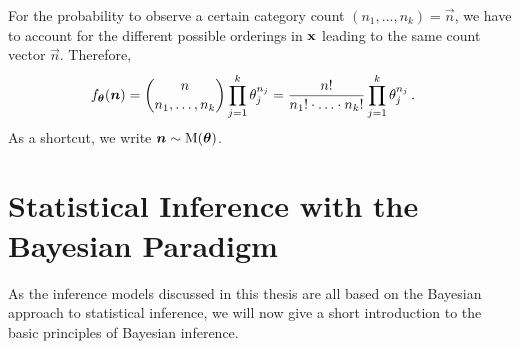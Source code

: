 For the probability to observe a certain category count $(n_1, \ldots, n_k) = \vec{n}$,
we have to account for the different possible orderings in $\mathbf{x}$ leading to the same count vector $\vec{n}$.
Therefore,
\begin{align}\label{eq:multinomdens}
f_{\boldsymbol{\theta}}({\bm n}) &= \binom{n}{n_1,\ldots,n_k} \prod_{j=1}^k \theta_j^{n_j}
                      = \frac{n!}{n_1!\cdot \ldots \cdot n_k!} \prod_{j=1}^k \theta_j^{n_j}\,.
\end{align}
As a shortcut, we write ${\bm n} \sim \operatorname{M}(\boldsymbol{\theta})$.


\section{Statistical Inference with the Bayesian Paradigm}
\label{sec:bayes-inference}

As the inference models discussed in this thesis are all based on the Bayesian approach to statistical inference,
we will now give a short introduction to the basic principles of Bayesian inference.

